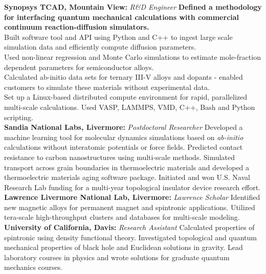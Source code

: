 \documentclass[11pt, a4paper]{article}
\newcommand{\years}[1]{\marginnote{\scriptsize #1}}
\begin{document}
{{\noindent
\years{2013-2014}\textbf{Synopsys TCAD, Mountain View:} 
\emph{R\&D Engineer} \newline
 \textbf{{\color{mycolor2}Defined a methodology for interfacing quantum mechanical calculations with commercial continuum reaction-diffusion simulators.}} \\ \textbullet Built software tool and API using Python and C++ to ingest large scale simulation data and efficiently compute diffusion parameters. \\ \textbullet Used non-linear regression and Monte Carlo simulations to estimate mole-fraction dependent parameters for semiconductor alloys. \\ \textbullet Calculated ab-initio data sets for ternary III-V alloys and dopants - enabled customers to simulate these materials without experimental data. \\ \textbullet Set up a Linux-based distributed compute environment for rapid, parallelized multi-scale calculations. Used VASP, LAMMPS, VMD, C++, Bash and Python scripting. \\

\noindent
\years{2011-2013}\textbf{Sandia National Labs, Livermore:}
\emph{Postdoctoral Researcher} \newline
Developed a machine learning tool for molecular dynamics simulations based on \textit{ab-initio} calculations without interatomic potentials or force fields. Predicted contact resistance to carbon nanostructures using multi-scale methods. Simulated transport across grain boundaries in thermoelectric materials and developed a thermoelectric materials aging software package. Initiated and won U.S. Naval Research Lab funding for a multi-year topological insulator device research effort.\\

\years{2009-2011}\textbf{Lawrence Livermore National Lab, Livermore:}
\emph{Lawrence Scholar}\newline
Identified new magnetic alloys for permanent magnet and spintronic applications. Utilized tera-scale high-throughput clusters and databases for multi-scale modeling.\\

\years{2004-2011}\textbf{University of California, Davis:} \emph{Research Assistant}\newline
Calculated properties of spintronic using density functional theory. Investigated topological and quantum mechanical properties of black hole and Euclidean solutions in gravity. Lead laboratory courses in physics and wrote solutions for graduate quantum mechanics courses. \\

}}
\end{document}
